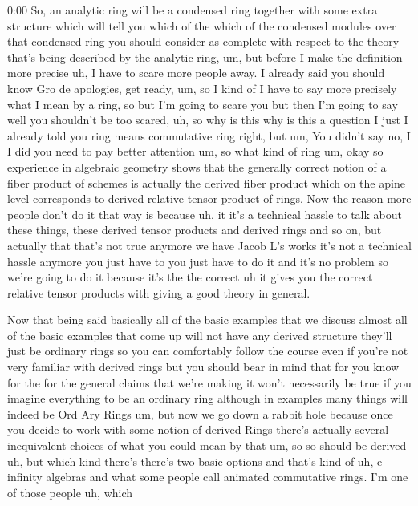 \begin{unfinished}{0:00}
So, an analytic ring will be a condensed ring together with some extra structure which will tell you which of the which of the condensed modules over that condensed ring you should consider as complete with respect to the theory that's being described by the analytic ring, um, but before I make the definition more precise uh, I have to scare more people away. I already said you should know Gro de apologies, get ready, um, so I kind of I have to say more precisely what I mean by a ring, so but I'm going to scare you but then I'm going to say well you shouldn't be too scared, uh, so why is this why is this a question I just I already told you ring means commutative ring right, but um, You didn't say no, I I did you need to pay better attention um, so what kind of ring um, okay so experience in algebraic geometry shows that the generally correct notion of a fiber product of schemes is actually the derived fiber product which on the apine level corresponds to derived relative tensor product of rings. Now the reason more people don't do it that way is because uh, it it's a technical hassle to talk about these things, these derived tensor products and derived rings and so on, but actually that that's not true anymore we have Jacob L's works it's not a technical hassle anymore you just have to you just have to do it and it's no problem so we're going to do it because it's the the correct uh it gives you the correct relative tensor products with giving a good theory in general.

Now that being said basically all of the basic examples that we discuss almost all of the basic examples that come up will not have any derived structure they'll just be ordinary rings so you can comfortably follow the course even if you're not very familiar with derived rings but you should bear in mind that for you know for the for the general claims that we're making it won't necessarily be true if you imagine everything to be an ordinary ring although in examples many things will indeed be Ord Ary Rings um, but now we go down a rabbit hole because once you decide to work with some notion of derived Rings there's actually several inequivalent choices of what you could mean by that um, so so should be derived uh, but which kind there's there's two basic options and that's kind of uh, e infinity algebras and what some people call animated commutative rings. I'm one of those people uh, which


\end{unfinished}
